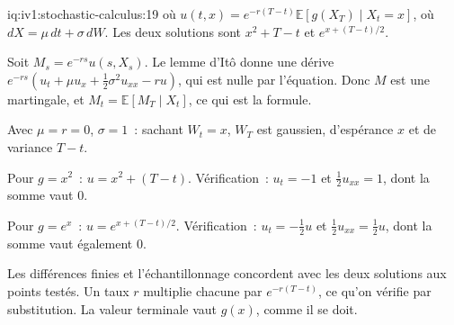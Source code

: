 \begin{solution}{iq:iv1:stochastic-calculus:19}
où $u(t, x) = e^{-r(T - t)}\mathbb{E}[g(X_T) \mid X_t = x]$, où $dX = \mu\,dt + \sigma\,dW$. Les deux solutions sont $x^2 + T - t$ et $e^{x + (T - t)/2}$.

Soit $M_s = e^{-rs}u(s, X_s)$. Le lemme d'Itô donne une dérive $e^{-rs}(u_t + \mu u_x + \frac12\sigma^2u_{xx} - ru)$, qui est nulle par l'équation. Donc $M$ est une martingale, et $M_t = \mathbb{E}[M_T \mid X_t]$, ce qui est la formule.

Avec $\mu = r = 0$, $\sigma = 1$~: sachant $W_t = x$, $W_T$ est gaussien, d'espérance $x$ et de variance $T - t$.

Pour $g = x^2$~: $u = x^2 + (T - t)$. Vérification~: $u_t = -1$ et $\frac12u_{xx} = 1$, dont la somme vaut 0.

Pour $g = e^x$~: $u = e^{x + (T - t)/2}$. Vérification~: $u_t = -\frac12u$ et $\frac12u_{xx} = \frac12u$, dont la somme vaut également 0.

Les différences finies et l'échantillonnage concordent avec les deux solutions aux points testés. Un taux $r$ multiplie chacune par $e^{-r(T - t)}$, ce qu'on vérifie par substitution. La valeur terminale vaut $g(x)$, comme il se doit.



\end{solution}

